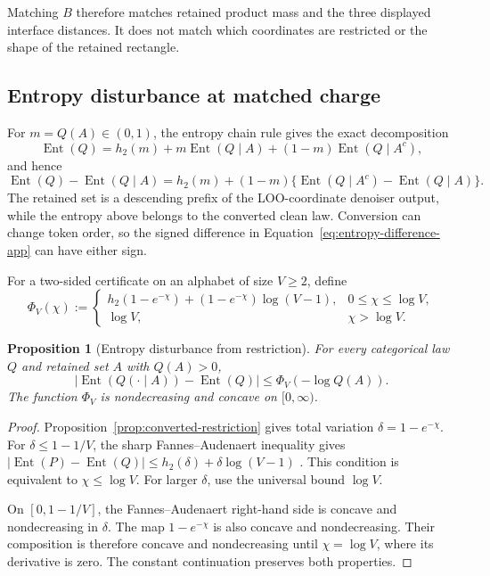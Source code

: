 \documentclass{article}
\newcommand{\Ent}{\operatorname{Ent}}
\newcommand{\1}{\mathbf 1}
\newtheorem{proposition}[theorem]{Proposition}
\theoremstyle{definition}
\begin{document}
Matching $B$ therefore matches retained product mass and the three displayed
interface distances. It does not match which coordinates are restricted or the
shape of the retained rectangle.

\subsection{Entropy disturbance at matched charge}
\label{app:entropy-geometry}

For $m=Q(A)\in(0,1)$, the entropy chain rule gives the exact decomposition
\begin{equation}
 \Ent(Q)=h_2(m)+m\Ent(Q\mid A)+(1-m)\Ent(Q\mid A^c),
 \label{eq:entropy-decomposition-app}
\end{equation}
and hence
\begin{equation}
 \Ent(Q)-\Ent(Q\mid A)
 =h_2(m)+(1-m)\{\Ent(Q\mid A^c)-\Ent(Q\mid A)\}.
 \label{eq:entropy-difference-app}
\end{equation}
The retained set is a descending prefix of the LOO-coordinate denoiser output, while the
entropy above belongs to the converted clean law. Conversion can change token
order, so the signed difference in Equation~\eqref{eq:entropy-difference-app}
can have either sign.

For a two-sided certificate on an alphabet of size $V\ge2$, define
\begin{equation}
 \Phi_V(\chi):=
 \begin{cases}
 h_2(1-e^{-\chi})+(1-e^{-\chi})\log(V-1),
 &0\le\chi\le\log V,\\[1mm]
 \log V,&\chi>\log V.
 \end{cases}
 \label{eq:entropy-envelope-app}
\end{equation}

\begin{proposition}[Entropy disturbance from restriction]
\label{prop:entropy-disturbance}
For every categorical law $Q$ and retained set $A$ with $Q(A)>0$,
\begin{equation}
 \left|\Ent(Q(\cdot\mid A))-\Ent(Q)\right|
 \le \Phi_V(-\log Q(A)).
 \label{eq:entropy-disturbance-app}
\end{equation}
The function $\Phi_V$ is nondecreasing and concave on $[0,\infty)$.
\end{proposition}

\begin{proof}
Proposition~\ref{prop:converted-restriction} gives total variation
$\delta=1-e^{-\chi}$. For $\delta\le1-1/V$, the sharp
Fannes--Audenaert inequality gives
$|\Ent(P)-\Ent(Q)|\le h_2(\delta)+\delta\log(V-1)$
\citep{audenaert2007sharp}. This condition is equivalent to
$\chi\le\log V$. For larger $\delta$, use the universal bound $\log V$.

On $[0,1-1/V]$, the Fannes--Audenaert right-hand side is concave and
nondecreasing in $\delta$. The map $1-e^{-\chi}$ is also concave and
nondecreasing. Their composition is therefore concave and nondecreasing until
$\chi=\log V$, where its derivative is zero. The constant continuation
preserves both properties.
\end{proof}
\end{document}
